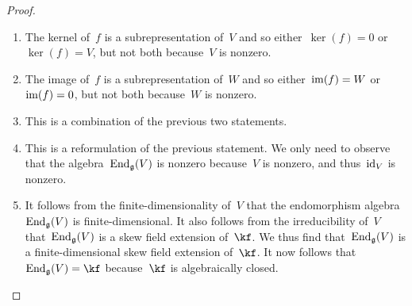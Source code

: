 \begin{proof}
  \leavevmode
  \begin{enumerate}
    \item
      The kernel of~$f$ is a subrepresentation of~$V$ and so either~$\ker(f) = 0$ or~$\ker(f) = V$, but not both because~$V$ is nonzero.
    \item
      The image of~$f$ is a subrepresentation of~$W$ and so either~$\operatorname{im}(f) = W$ or~$\operatorname{im}(f) = 0$, but not both because~$W$ is nonzero.
    \item
      This is a combination of the previous two statements.
    \item
      This is a reformulation of the previous statement.
      We only need to observe that the algebra~$\operatorname{End}_{\mathfrak{g}}(V)$ is nonzero because~$V$ is nonzero, and thus~$\mathrm{id}_V$ is nonzero.
    \item
      It follows from the finite-dimensionality of~$V$ that the endomorphism algebra~$\operatorname{End}_{\mathfrak{g}}(V)$ is finite-dimensional.
      It also follows from the irreducibility of~$V$ that~$\operatorname{End}_{\mathfrak{g}}(V)$ is a skew field extension of~$\kf$.
      We thus find that~$\operatorname{End}_{\mathfrak{g}}(V)$ is a finite-dimensional skew field extension of~$\kf$.
      It now follows that~$\End_{\glie}(V) = \kf$ because~$\kf$ is algebraically closed.
    \qedhere
  \end{enumerate}
\end{proof}





